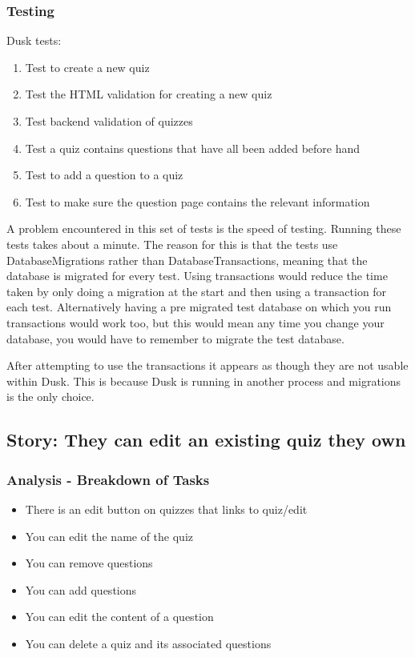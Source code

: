 \subsubsection{Testing}
Dusk tests:
\begin{enumerate}
	\item Test to create a new quiz
	\item Test the HTML validation for creating a new quiz
	\item Test backend validation of quizzes
	\item Test a quiz contains questions that have all been added before hand
	\item Test to add a question to a quiz
	\item Test to make sure the question page contains the relevant information
\end{enumerate}
A problem encountered in this set of tests is the speed of testing. Running these tests takes about a minute. The reason for this is that the tests use DatabaseMigrations rather than DatabaseTransactions, meaning that the database is migrated for every test. Using transactions would reduce the time taken by only doing a migration at the start and then using a transaction for each test. Alternatively having a pre migrated test database on which you run transactions would work too, but this would mean any time you change your database, you would have to remember to migrate the test database. 

After attempting to use the transactions it appears as though they are not usable within Dusk. This is because Dusk is running in another process and migrations is the only choice\cite{dusk-transactions}. 
\newpage

\subsection{Story: They can edit an existing quiz they own}
\subsubsection{Analysis - Breakdown of Tasks}
\begin{itemize}
	\item There is an edit button on quizzes that links to quiz/edit
	\item You can edit the name of the quiz
	\item You can remove questions
	\item You can add questions
	\item You can edit the content of a question
	\item You can delete a quiz and its associated questions
\end{itemize}
